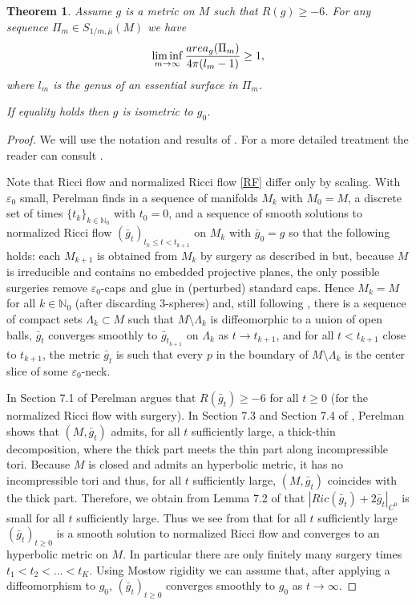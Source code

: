 \documentclass[11pt]{amsart}
\def\N{\mathbb N}
\newtheorem{thm}{Theorem}[section]
\theoremstyle{remark}
\theoremstyle{definition}
\begin{document}
{{	\begin{thm}\label{asympt.thm2} Assume $g$ is a metric on $M$ such that $R(g)\geq -6$. For any sequence  $\Pi_m\in {S_{1/m,\bar \mu}(M)}$ we have
		$$\liminf_{m\to\infty}\frac{{\rm area}_g(\Pi_m)}{4\pi(l_m-1)}\geq 1,$$
		where $l_m$ is the genus of an essential surface in $\Pi_m$.
		
		If equality holds then $g$ is isometric to $g_0$.
	\end{thm}
	\begin{proof}
		We will use the notation and results of \cite{perelman}. For a more detailed treatment the reader can consult \cite{bamler}.
		
		Note that Ricci flow and normalized Ricci flow \eqref{RF} differ only by scaling. With $\varepsilon_0$ small, Perelman finds in  \cite[Section 4]{perelman}  a sequence of manifolds $M_k$ with $M_0=M$, a discrete set of times $\{t_k\}_{k\in\N_0}$ with $t_0=0$,  and a sequence of smooth solutions to normalized Ricci flow $(\bar g_t)_{t_k\leq t< t_{k+1}}$ on $M_k$ with $\bar g_0=g$ so that the following holds: each $M_{k+1}$ is obtained from $M_k$ by surgery as described in \cite[Section 4.4]{perelman} but, because $M$ is irreducible and contains no embedded projective planes, the only possible surgeries remove $\varepsilon_0$-caps and glue in (perturbed) standard caps. Hence $M_k=M$ for all $k\in \N_0$ (after discarding  $3$-spheres) and, still following   \cite[Section 4]{perelman},  there is a sequence of compact sets $\Lambda_k\subset M$ such that $M\setminus \Lambda_k$ is diffeomorphic to a union of open balls, $\bar g_t$ converges smoothly to $\bar g_{t_{k+1}}$ on $\Lambda_k$ as $t\to t_{k+1}$, and for all $t<t_{k+1}$ close to $t_{k+1}$, the metric $\bar g_t$ is such that every $p$ in the boundary of $M\setminus \Lambda_k$ is  the center slice of some $\varepsilon_0$-neck. 
		
		
		In Section 7.1 of \cite{perelman} Perelman argues  that  $R(\bar g_t)\geq -6$ for all $t\geq 0$ (for the  normalized Ricci flow with surgery). In Section 7.3 and Section 7.4 of \cite{perelman}, Perelman shows that $(M,\bar g_t)$ admits, for all $t$ sufficiently large, a thick-thin decomposition, where the thick part meets the thin part along incompressible tori. Because $M$ is  closed and admits an hyperbolic metric, it has no incompressible tori and thus, for all $t$ sufficiently large, 
		$(M,\bar g_t)$ coincides with the thick part. Therefore, we obtain from Lemma 7.2 of \cite{perelman} that   $|Ric(\bar g_t)+2\bar g_t|_{C^0}$ is small  for  all $t$ sufficiently large. Thus we see from \cite{ye}  that for all $t$ sufficiently large $(\bar g_t)_{t\geq 0}$ is a smooth solution to normalized Ricci flow and converges to an hyperbolic metric  on $M$. In particular there are only finitely many surgery times $t_1<t_2<\ldots<t_K$. Using Mostow rigidity  we can  assume that, after applying a diffeomorphism to ${g_0}$,   $(\bar g_t)_{t\geq 0}$ converges smoothly to $g_0$ as $t\to\infty$. 
		

\end{proof}}}
\end{document}
